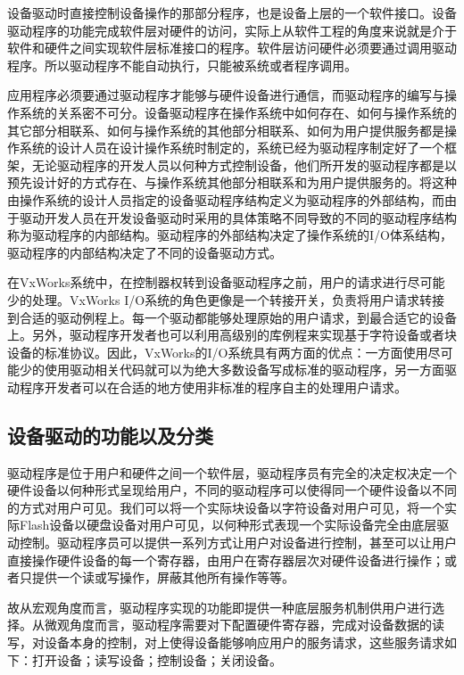 	
	
	设备驱动时直接控制设备操作的那部分程序，也是设备上层的一个软件接口。设备驱动程序的功能完成软件层对硬件的访问，实际上从软件工程的角度来说就是介于软件和硬件之间实现软件层标准接口的程序。软件层访问硬件必须要通过调用驱动程序。所以驱动程序不能自动执行，只能被系统或者程序调用。
	
	应用程序必须要通过驱动程序才能够与硬件设备进行通信，而驱动程序的编写与操作系统的关系密不可分。设备驱动程序在操作系统中如何存在、如何与操作系统的其它部分相联系、如何与操作系统的其他部分相联系、如何为用户提供服务都是操作系统的设计人员在设计操作系统时制定的，系统已经为驱动程序制定好了一个框架，无论驱动程序的开发人员以何种方式控制设备，他们所开发的驱动程序都是以预先设计好的方式存在、与操作系统其他部分相联系和为用户提供服务的。将这种由操作系统的设计人员指定的设备驱动程序结构定义为驱动程序的外部结构，而由于驱动开发人员在开发设备驱动时采用的具体策略不同导致的不同的驱动程序结构称为驱动程序的内部结构。驱动程序的外部结构决定了操作系统的I/O体系结构，驱动程序的内部结构决定了不同的设备驱动方式。

	在VxWorks系统中，在控制器权转到设备驱动程序之前，用户的请求进行尽可能少的处理。VxWorks I/O系统的角色更像是一个转接开关，负责将用户请求转接到合适的驱动例程上。每一个驱动都能够处理原始的用户请求，到最合适它的设备上。另外，驱动程序开发者也可以利用高级别的库例程来实现基于字符设备或者块设备的标准协议。因此，VxWorks的I/O系统具有两方面的优点：一方面使用尽可能少的使用驱动相关代码就可以为绝大多数设备写成标准的驱动程序，另一方面驱动程序开发者可以在合适的地方使用非标准的程序自主的处理用户请求。





\subsection{设备驱动的功能以及分类}\label{sec:设备分类}
	驱动程序是位于用户和硬件之间一个软件层，驱动程序员有完全的决定权决定一个硬件设备以何种形式呈现给用户，不同的驱动程序可以使得同一个硬件设备以不同的方式对用户可见。我们可以将一个实际块设备以字符设备对用户可见，将一个实际Flash设备以硬盘设备对用户可见，以何种形式表现一个实际设备完全由底层驱动控制。驱动程序员可以提供一系列方式让用户对设备进行控制，甚至可以让用户直接操作硬件设备的每一个寄存器，由用户在寄存器层次对硬件设备进行操作；或者只提供一个读或写操作，屏蔽其他所有操作等等。
	
	故从宏观角度而言，驱动程序实现的功能即提供一种底层服务机制供用户进行选择。从微观角度而言，驱动程序需要对下配置硬件寄存器，完成对设备数据的读写，对设备本身的控制，对上使得设备能够响应用户的服务请求，这些服务请求如下：打开设备；读写设备；控制设备；关闭设备。

